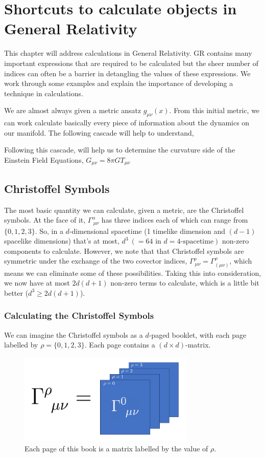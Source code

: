 \chapter{Shortcuts to calculate objects in General Relativity}
This chapter will address calculations in General Relativity. GR contains many important expressions that are required to be calculated but the sheer number of indices can often be a barrier in detangling the values of these expressions. We work through some examples and explain the importance of developing a technique in calculations. 

We are almost always given a metric ansatz $g_{\mu\nu}(x)$. From this initial metric, we can work calculate basically every piece of information about the dynamics on our manifold. The following cascade will help to understand, 
\begin{equation}    
\end{equation}

Following this cascade, will help us to determine the curvature side of the Einstein Field Equations, $G_{\mu\nu} = 8\pi GT_{\mu\nu}$
\section{Christoffel Symbols}
The most basic quantity we can calculate, given a metric, are the Christoffel symbols. At the face of it, $\Gamma^{\alpha}_{\ \mu\nu}$ has three indices each of which can range from $\{0,1,2,3\}$. So, in a $d$-dimensional spacetime (1 timelike dimension and $(d-1)$ spacelike dimensions) that's at most, $d^3\ (=64\text{ in }d=4\text{-spacetime})$ non-zero components to calculate. However, we note that that Christoffel symbols are symmetric under the exchange of the two covector indices, $\Gamma^{\rho}_{\ \mu\nu} = \Gamma^{\rho}_{(\mu\nu)}$, which means we can eliminate some of these possibilities. Taking this into consideration, we now have at most $2d(d+1)$ non-zero terms to calculate, which is a little bit better ($d^3\geq 2d(d+1)$).
\subsection{Calculating the Christoffel Symbols}
We can imagine the Christoffel symbols as a $d$-paged booklet, with each page labelled by $\rho = \{0, 1, 2, 3\}$. Each page contains a $(d\times d)$-matrix. 

\begin{figure}
\centering\includegraphics[width=0.75\textwidth]{Images/gammaBooklet.PNG}
\caption{\footnotesize{Each page of this book is a matrix labelled by the value of $\rho$.}}
\label{fig:gamma-booklet}
\end{figure}

